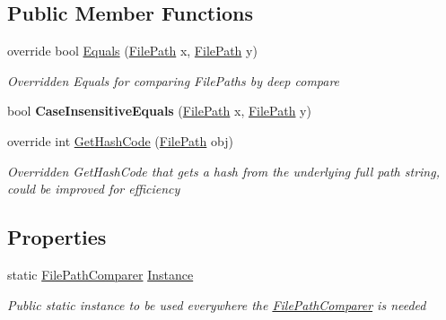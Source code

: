 \subsection*{Public Member Functions}
\begin{DoxyCompactItemize}
\item 
override bool \hyperlink{class_cloud_api_public_1_1_model_1_1_file_path_comparer_a0f01db4ef653ff9e4de84885397f98a4}{Equals} (\hyperlink{class_cloud_api_public_1_1_model_1_1_file_path}{File\-Path} x, \hyperlink{class_cloud_api_public_1_1_model_1_1_file_path}{File\-Path} y)
\begin{DoxyCompactList}\small\item\em Overridden Equals for comparing File\-Paths by deep compare \end{DoxyCompactList}\item 
\hypertarget{class_cloud_api_public_1_1_model_1_1_file_path_comparer_a6e31d216862513938b1f213f1a89b8a4}{bool {\bfseries Case\-Insensitive\-Equals} (\hyperlink{class_cloud_api_public_1_1_model_1_1_file_path}{File\-Path} x, \hyperlink{class_cloud_api_public_1_1_model_1_1_file_path}{File\-Path} y)}\label{class_cloud_api_public_1_1_model_1_1_file_path_comparer_a6e31d216862513938b1f213f1a89b8a4}

\item 
override int \hyperlink{class_cloud_api_public_1_1_model_1_1_file_path_comparer_a086b67bdaada35cdd4f744130a64cd4c}{Get\-Hash\-Code} (\hyperlink{class_cloud_api_public_1_1_model_1_1_file_path}{File\-Path} obj)
\begin{DoxyCompactList}\small\item\em Overridden Get\-Hash\-Code that gets a hash from the underlying full path string, could be improved for efficiency \end{DoxyCompactList}\end{DoxyCompactItemize}
\subsection*{Properties}
\begin{DoxyCompactItemize}
\item 
static \hyperlink{class_cloud_api_public_1_1_model_1_1_file_path_comparer}{File\-Path\-Comparer} \hyperlink{class_cloud_api_public_1_1_model_1_1_file_path_comparer_a72c16461590ae2298b139f86689991c8}{Instance}
\begin{DoxyCompactList}\small\item\em Public static instance to be used everywhere the \hyperlink{class_cloud_api_public_1_1_model_1_1_file_path_comparer}{File\-Path\-Comparer} is needed \end{DoxyCompactList}\end{DoxyCompactItemize}


